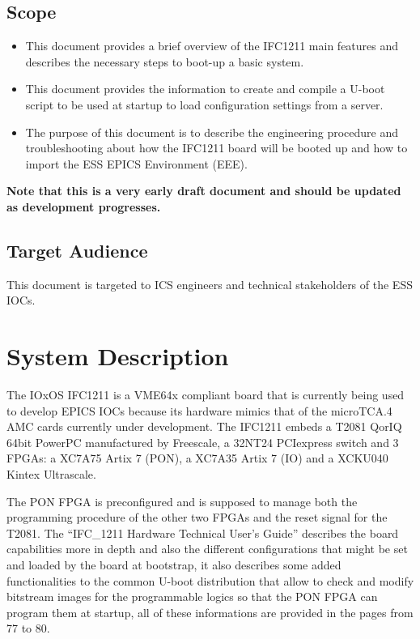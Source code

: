 \documentclass[11pt
  , a4paper
  , article
  , oneside
  , showtrims
]{memoir}
\begin{document}
\section{Scope}
\begin{itemize}
\item This document provides a brief overview of the IFC1211 main features and describes the necessary steps to boot-up a basic system.
\item This document provides the information to create and compile a U-boot script to be used at startup to load configuration settings from a server. 
\item The purpose of this document is to describe the engineering procedure and troubleshooting about how the IFC1211 board will be booted up and how to import the ESS EPICS Environment (EEE).

\end{itemize}
\textbf{Note that this is a very early draft document and should be updated as development progresses.}

\section{Target Audience}
This document is targeted to ICS engineers and technical stakeholders of the ESS IOCs. %

\chapter{System Description}
The IOxOS IFC1211 is a VME64x compliant board that is currently being used to develop EPICS IOCs because its hardware mimics that of the microTCA.4 AMC cards currently under development.
The IFC1211 embeds a T2081 QorIQ 64bit PowerPC manufactured by Freescale, a 32NT24 PCIexpress switch and 3 FPGAs: a XC7A75 Artix 7 (PON), a XC7A35 Artix 7 (IO) and a XCKU040 Kintex Ultrascale.

The PON FPGA is preconfigured and is supposed to manage both the programming procedure of the other two FPGAs and the reset signal for the T2081.
The ``IFC\_1211 Hardware Technical User's Guide''\cite{IFC1211_HW_TUG} describes the board capabilities more in depth and also the different configurations that might be set and loaded by the board at bootstrap, it also describes some added functionalities to the common U-boot distribution that allow to check and modify bitstream images for the programmable logics so that the PON FPGA can program them at startup, all of these informations are provided in the pages from 77 to 80.
\end{document}
